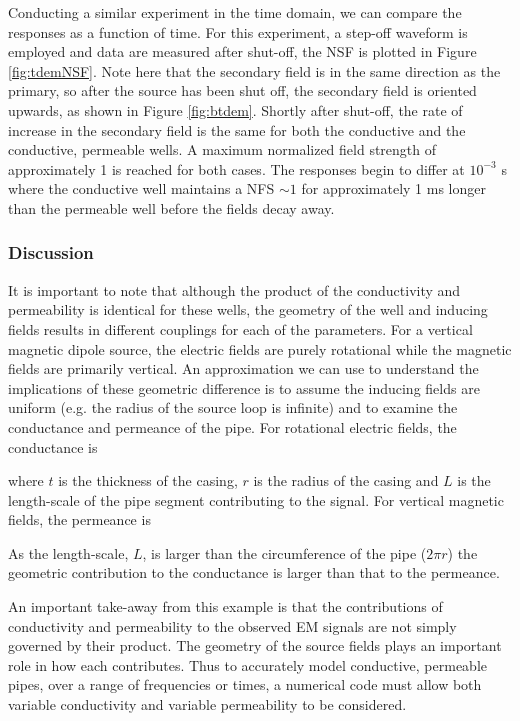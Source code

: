 





Conducting a similar experiment in the time domain, we can compare the responses as a function of time. For this experiment, a step-off waveform is employed and data are measured after shut-off, the NSF is plotted in Figure \ref{fig:tdemNSF}. Note here that the secondary field is in the same direction as the primary, so after the source has been shut off, the secondary field is oriented upwards, as shown in Figure \ref{fig:btdem}. Shortly after shut-off, the rate of increase in the secondary field is the same for both the conductive and the conductive, permeable wells. A maximum normalized field strength of approximately 1 is reached for both cases. The responses begin to differ at $10^{-3}$ s where the conductive well maintains a NFS $\sim 1$ for approximately 1 ms longer than the permeable well before the fields decay away.








\subsubsection{Discussion}

It is important to note that although the product of the conductivity and permeability is identical for these wells, the geometry of the well and inducing fields results in different couplings for each of the parameters. For a vertical magnetic dipole source, the electric fields are purely rotational while the magnetic fields are primarily vertical. An approximation we can use to understand the implications of these geometric difference is to assume the inducing fields are uniform (e.g. the radius of the source loop is infinite) and to examine the conductance and permeance of the pipe. For rotational electric fields, the conductance is

where $t$ is the thickness of the casing, $r$ is the radius of the casing and $L$ is the length-scale of the pipe segment contributing to the signal. For vertical magnetic fields, the permeance is

As the length-scale, $L$, is larger than the circumference of the pipe ($2\pi r$) the geometric contribution to the conductance is larger than that to the permeance.

An important take-away from this example is that the contributions of conductivity and permeability to the observed EM signals are not simply governed by their product. The geometry of the source fields plays an important role in how each contributes. Thus to accurately model conductive, permeable pipes, over a range of frequencies or times, a numerical code must allow both variable conductivity and variable permeability to be considered.

